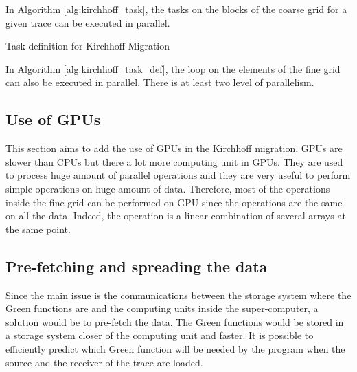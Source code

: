 In Algorithm \ref{alg:kirchhoff_task}, the tasks on the blocks of the coarse grid for a given trace can be executed in parallel.

\begin{algorithm}[h]
	\DontPrintSemicolon
	\SetAlgoVlined
	\caption{Task definition for Kirchhoff Migration \label{alg:kirchhoff_task_def}}

\end{algorithm}

In Algorithm \ref{alg:kirchhoff_task_def}, the loop on the elements of the fine grid can also be executed in parallel.
There is at least two level of parallelism.


\subsection{Use of GPUs}
This section aims to add the use of GPUs in the Kirchhoff migration.
GPUs are slower than CPUs but there a lot more computing unit in GPUs.
They are used to process huge amount of parallel operations and they are very useful to perform simple operations on huge amount of data.
Therefore, most of the operations inside the fine grid can be performed on GPU since the operations are the same on all the data.
Indeed, the operation is a linear combination of several arrays at the same point.

\subsection{Pre-fetching and spreading the data}
Since the main issue is the communications between the storage system where the Green functions are and the computing units inside the super-computer, a solution would be to pre-fetch the data.
The Green functions would be stored in a storage system closer of the computing unit and faster.
It is possible to efficiently predict which Green function will be needed by the program when the source and the receiver of the trace are loaded.

